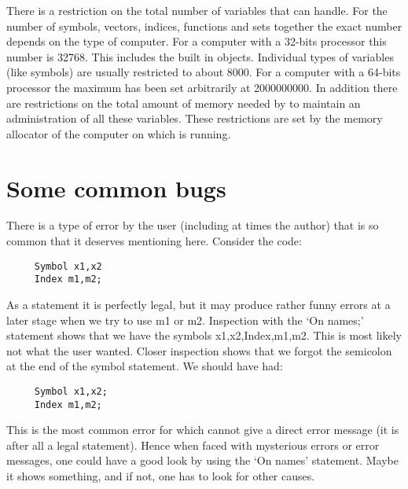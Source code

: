 There is a restriction on the total number of 
variables that {\FORM} can handle. For the 
number of symbols, vectors, indices, functions and sets together the exact 
number depends on the type of computer. For a computer with a 32-bits 
processor this number is 32768. This includes the built in objects. 
Individual types of variables (like symbols) are usually restricted to 
about 8000. For a 
computer with a 64-bits processor the maximum has been set arbitrarily at 
2000000000. In addition there are restrictions on the total amount of 
memory needed by {\FORM} to maintain an 
administration of all these variables. These restrictions are set by the 
memory allocator of the computer on which {\FORM} is running.

\section{Some common bugs}

There is a type of error by the user (including at 
times the author) that is so common that it deserves mentioning here. 
Consider the code:
\begin{verbatim}
     Symbol x1,x2
     Index m1,m2;
\end{verbatim}
As a statement it is perfectly legal, but it may produce 
rather funny errors at a later stage when we try to use m1 or m2. 
Inspection with the `On names;' statement shows that we have the symbols 
x1,x2,Index,m1,m2. This is most likely not what the user wanted. Closer 
inspection shows that we forgot the semicolon at the end of the symbol 
statement. We should have had:
\begin{verbatim}
     Symbol x1,x2;
     Index m1,m2;
\end{verbatim}
This is the most common error for which {\FORM} cannot give a direct error 
message (it is after all a legal statement). Hence when faced with 
mysterious errors or error messages, one could have a good look by using 
the `On names' statement. Maybe it shows something, and if not, one has to 
look for other causes.
